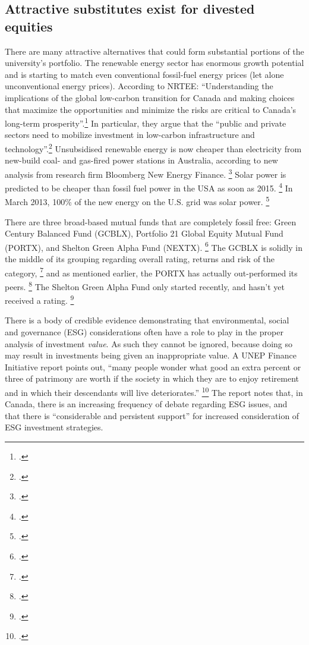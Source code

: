 	\subsection {Attractive substitutes exist for divested equities}



There are many attractive alternatives that could form substantial portions of the university's portfolio.
The renewable energy sector has enormous growth potential and is starting to match even conventional fossil-fuel energy prices (let alone unconventional energy prices).
According to NRTEE: ``Understanding the implications of the global low-carbon transition for Canada and making choices that maximize the opportunities and minimize the risks are critical to Canada's long-term prosperity''.\footcite[][p. 15]{FramingFuture}
In particular, they argue that the ``public and private sectors need to mobilize investment in low-carbon infrastructure and technology''.\footcite[][p. 17]{FramingFuture}
Unsubsidised renewable energy is now cheaper than electricity from new-build coal- and gas-fired power stations in Australia, according to new analysis from research firm Bloomberg New Energy Finance. \footcite{BlombergAussieWind}
Solar power is predicted to be cheaper than fossil fuel power in the USA as soon as 2015. \footcite{GlobalDataSolar}
In March 2013, 100\% of the new energy on the U.S. grid was solar power. \footcite{SmartPlanetSolar100}



There are three broad-based mutual funds that are completely fossil free: Green Century Balanced Fund (GCBLX), Portfolio 21 Global Equity Mutual Fund (PORTX), and Shelton Green Alpha Fund (NEXTX). \footcite{GFFMyMoney}
The GCBLX is solidly in the middle of its grouping regarding overall rating, returns and risk of the category, \footcite{GCBLX} and as mentioned earlier, the PORTX has actually out-performed its peers. \footcite{PORTX}
The Shelton Green Alpha Fund only started recently, and hasn't yet received a rating. \footcite{NEXTX}



There is a body of credible evidence demonstrating that environmental, social and governance (ESG) considerations often have a role to play in the proper analysis of investment \emph{value}. 
As such they cannot be ignored, because doing so may result in investments being given an inappropriate value.
A UNEP Finance Initiative report points out, ``many people wonder what good an extra percent or three of patrimony are worth if the society in which they are to enjoy retirement and in which their descendants will live deteriorates.'' \footcite{UNEPFinanceInit}
The report notes that, in Canada, there is an increasing frequency of debate regarding ESG issues, and that there is ``considerable and persistent support'' for increased consideration of ESG investment strategies.



